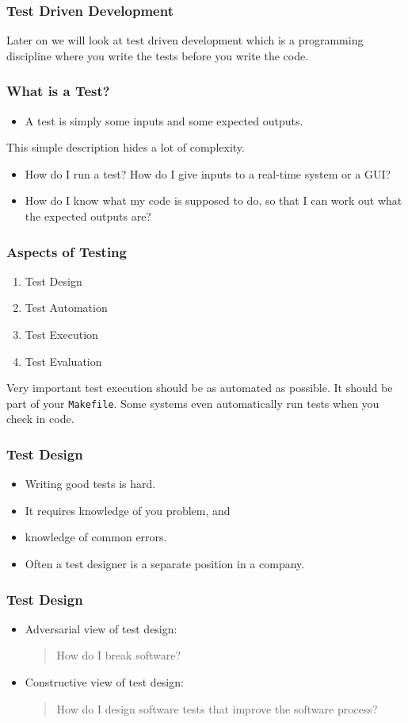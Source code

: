 \documentclass{beamer}
\begin{document}
\begin{frame}
  \frametitle{Test Driven Development}
  Later on we will look at test driven development which is a
  programming discipline where you write the tests before you write
  the code.
\end{frame}
\begin{frame}
  \frametitle{What is a Test?}

  \begin{itemize}
  \item A test is simply some inputs and some expected outputs.
  \end{itemize}
  This simple description hides a lot of complexity.
  \begin{itemize}
  \item How do I run a test? How do I give inputs to a real-time system or a
    GUI?
  \item How do I know what my code is supposed to do, so that I can work out
    what the expected outputs are?
  \end{itemize}
\end{frame}
\begin{frame}
  \frametitle{Aspects of Testing}
  \begin{enumerate}
  \item Test Design
  \item Test Automation
  \item Test Execution
  \item Test Evaluation
  \end{enumerate}
Very important test execution should be as automated as possible. It
should be part of your {\tt Makefile}. Some systems even automatically
run tests when you check in code.
\end{frame}
\begin{frame}
  \frametitle{Test Design}
  \begin{itemize}
  \item  Writing good tests is  hard. 
  \item It requires knowledge of you  problem, and 
  \item knowledge of common errors.
  \item Often a test designer is a separate  position in a company.
  \end{itemize}
\end{frame}
\begin{frame}
  \frametitle{Test Design}
  
  \begin{itemize}
  \item Adversarial view of test design: 
    \begin{quote}
       How do I break software? \pause
    \end{quote}
  \item Constructive view of test design:
    \begin{quote}
       How do I design software tests that improve the software process?
    \end{quote}
  \end{itemize}
\end{frame}
\end{document}
